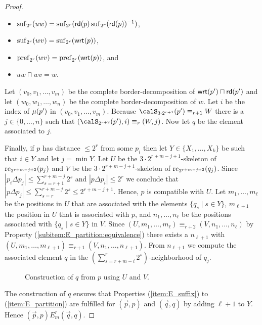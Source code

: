 \begin{proof}
	\begin{minipage}{0.55\linewidth}
	\begin{itemize}
		\item $\operatorname{suf}_{2^{r}}(uw) = \operatorname{suf}_{2^{r}}(\mathsf{rd}(p)\operatorname{suf}_{2^{r}}(\mathsf{rd}(p))^{-1} )$,
		\item $\operatorname{suf}_{2^{r}}(wv) = \operatorname{suf}_{2^{r}}(\mathsf{wrt}(p))$,
	\end{itemize}
    \end{minipage}
    \begin{minipage}{0.44\linewidth}
    	\begin{itemize}
    		\item $\operatorname{pref}_{2^{r}}(wv) = \operatorname{pref}_{2^{r}}(\mathsf{wrt}(p))$, and
    		\item $uw\sqcap wv = w$.
    	\end{itemize}
    \end{minipage}
	Let $(v_0,v_1,\ldots, v_m)$ be the complete border-decomposition of $\mathsf{wrt}(p')\sqcap \mathsf{rd}(p')$ and let $(w_0, w_1,\ldots, w_n)$ be the complete border-decomposition of $w$. Let $i$
	be the index of $\mu(p')$ in $(v_0,v_1,\ldots, v_m)$. Because $\calS_{3\cdot 2^{r+1}}(p') \equiv_{r+1} W$ there is a $j\in \{0,\ldots,n\}$ such that $(\calS_{2^{r+2}}(p'), i) \equiv_r (W,j)$.
	Now let $q$ be the element associated to $j$.
	
	
	Finally, if $p$ has distance $\leq 2^{r}$ from some $p_i$ then let $Y\in \{X_1,\ldots,X_k\}$ be such that $i\in Y$ and let $j=\min Y$. Let $U$ be the $3\cdot 2^{r+m-j+1}$-skeleton of $\operatorname{rc}_{2^{r+m-j+2}}(p_j)$ and 
	$V$ be the $3\cdot 2^{r+m-j+1}$-skeleton of $\operatorname{rc}_{2^{r+m-j+2}}(q_j)$.
	Since $|p_i\Delta p_j| \leq \sum_{s=r+1}^{r+m-j} 2^s$ and $|p\Delta p_i| \leq 2^r$ we conclude that $|p\Delta p_j| \leq \sum_{s=r}^{r+m-j} 2^s \leq 2^{r+m-j+1}$. Hence, $p$ is compatible with $U$. Let $m_1,\ldots,m_\ell$ be the positions in $U$ that are associated with the elements $\{q_s \mid s\in Y\}$, $m_{\ell+1}$ the position in $U$ that is associated with $p$, and $n_1,\ldots,n_\ell$ be the positions associated with $\{q_s \mid s\in Y\}$ in $V$. Since $(U,m_1,\ldots,m_\ell) \equiv_{r+2} (V,n_1,\ldots,n_\ell)$ by Property (\ref{subitem:E_partition:equivalence}) there exists a $n_{\ell+1}$ with $(U,m_1,\ldots,m_{\ell+1}) \equiv_{r+1} (V,n_1,\ldots,n_{\ell+1})$. From $n_{\ell+1}$ we compute the associated element $q$
	in the $(\sum_{s= r+m-i}^{r} 2^s)$-neighborhood of $q_j$.
	\begin{figure}[h]
		\centering
		\caption{\label{fig:skeleton}Construction of $q$ from $p$ using $U$ and $V$.}
	\end{figure}
	The construction of $q$ ensures that Properties (\ref{item:E_suffix}) to (\ref{item:E_partition}) are fulfilled for $(\vec{p}, p)$ and $(\vec{q}, q)$ by adding $\ell+1$ to $Y$. Hence $(\vec{p}, p) E^r_m (\vec{q}, q)$.
\end{proof}

